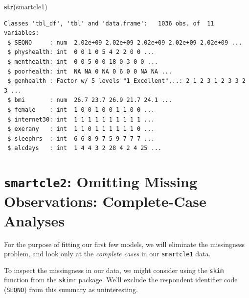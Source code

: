 \documentclass[]{book}
\newenvironment{Shaded}{\begin{snugshade}}{\end{snugshade}}
\newcommand{\KeywordTok}[1]{\textcolor[rgb]{0.13,0.29,0.53}{\textbf{#1}}}
\newcommand{\DataTypeTok}[1]{\textcolor[rgb]{0.13,0.29,0.53}{#1}}
\newcommand{\StringTok}[1]{\textcolor[rgb]{0.31,0.60,0.02}{#1}}
\newcommand{\OtherTok}[1]{\textcolor[rgb]{0.56,0.35,0.01}{#1}}
\newcommand{\OperatorTok}[1]{\textcolor[rgb]{0.81,0.36,0.00}{\textbf{#1}}}
\newcommand{\NormalTok}[1]{#1}
\theoremstyle{definition}
\theoremstyle{definition}
\theoremstyle{definition}
\theoremstyle{remark}
\begin{document}
\begin{Shaded}
\begin{Highlighting}[]
\KeywordTok{str}\NormalTok{(smartcle1)}
\end{Highlighting}
\end{Shaded}

\begin{verbatim}
Classes 'tbl_df', 'tbl' and 'data.frame':   1036 obs. of  11 variables:
 $ SEQNO     : num  2.02e+09 2.02e+09 2.02e+09 2.02e+09 2.02e+09 ...
 $ physhealth: int  0 0 1 0 5 4 2 2 0 0 ...
 $ menthealth: int  0 0 5 0 0 18 0 3 0 0 ...
 $ poorhealth: int  NA NA 0 NA 0 6 0 0 NA NA ...
 $ genhealth : Factor w/ 5 levels "1_Excellent",..: 2 1 2 3 1 2 3 3 2 3 ...
 $ bmi       : num  26.7 23.7 26.9 21.7 24.1 ...
 $ female    : int  1 0 0 1 0 0 1 1 0 0 ...
 $ internet30: int  1 1 1 1 1 1 1 1 1 1 ...
 $ exerany   : int  1 1 0 1 1 1 1 1 1 0 ...
 $ sleephrs  : int  6 6 8 9 7 5 9 7 7 7 ...
 $ alcdays   : int  1 4 4 3 2 28 4 2 4 25 ...
\end{verbatim}

\section{\texorpdfstring{\texttt{smartcle2}: Omitting Missing
Observations: Complete-Case
Analyses}{smartcle2: Omitting Missing Observations: Complete-Case Analyses}}\label{smartcle2-omitting-missing-observations-complete-case-analyses}

For the purpose of fitting our first few models, we will eliminate the
missingness problem, and look only at the \emph{complete cases} in our
\texttt{smartcle1} data.

To inspect the missingness in our data, we might consider using the
\texttt{skim} function from the \texttt{skimr} package. We'll exclude
the respondent identifier code (\texttt{SEQNO}) from this summary as
uninteresting.

\begin{Shaded}
\end{Shaded}
\end{document}
